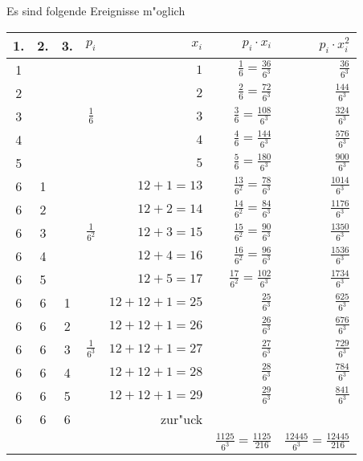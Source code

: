 \begin{loesung}
Es sind folgende Ereignisse m"oglich
\begin{center}
\begin{tabular}{|ccc|c|r|r|r|}
\hline
1.&2.&3.&$p_i$&$x_i$&$p_i\cdot x_i$&$p_i\cdot x_i^2$\\
\hline
1& & &              &$         1$&$   \frac{1}{6}=\frac{ 36}{6^3}$&$\frac{   36}{6^3}$\\
2& & &              &$         2$&$   \frac{2}{6}=\frac{ 72}{6^3}$&$\frac{  144}{6^3}$\\
3& & &$    \frac16 $&$         3$&$   \frac{3}{6}=\frac{108}{6^3}$&$\frac{  324}{6^3}$\\
4& & &              &$         4$&$   \frac{4}{6}=\frac{144}{6^3}$&$\frac{  576}{6^3}$\\
5& & &              &$         5$&$   \frac{5}{6}=\frac{180}{6^3}$&$\frac{  900}{6^3}$\\
\hline
6&1& &              &$   12+1=13$&$\frac{13}{6^2}=\frac{ 78}{6^3}$&$\frac{ 1014}{6^3}$\\
6&2& &              &$   12+2=14$&$\frac{14}{6^2}=\frac{ 84}{6^3}$&$\frac{ 1176}{6^3}$\\
6&3& &$\frac1{6^2} $&$   12+3=15$&$\frac{15}{6^2}=\frac{ 90}{6^3}$&$\frac{ 1350}{6^3}$\\
6&4& &              &$   12+4=16$&$\frac{16}{6^2}=\frac{ 96}{6^3}$&$\frac{ 1536}{6^3}$\\
6&5& &              &$   12+5=17$&$\frac{17}{6^2}=\frac{102}{6^3}$&$\frac{ 1734}{6^3}$\\
\hline
6&6&1&              &$12+12+1=25$&$               \frac{ 25}{6^3}$&$\frac{  625}{6^3}$\\
6&6&2&              &$12+12+1=26$&$               \frac{ 26}{6^3}$&$\frac{  676}{6^3}$\\
6&6&3&$\frac1{6^3} $&$12+12+1=27$&$               \frac{ 27}{6^3}$&$\frac{  729}{6^3}$\\
6&6&4&              &$12+12+1=28$&$               \frac{ 28}{6^3}$&$\frac{  784}{6^3}$\\
6&6&5&              &$12+12+1=29$&$               \frac{ 29}{6^3}$&$\frac{  841}{6^3}$\\
6&6&6&              &zur"uck     &                                &                   \\
\hline
 & & &              &            &$\frac{1125}{6^3}=\frac{1125}{216}$
                                                                  &$\frac{12445}{6^3}=\frac{12445}{216}$\\

\end{tabular}
\end{center}
\end{loesung}

